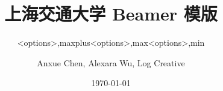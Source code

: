 \documentclass[
    aspectratio=169
]{ctexbeamer}
\begin{document}
    \title[SJTU Beamer Template] %
    {\textbf{上海交通大学 Beamer 模版}} %

    \author[Anxue Chen, Alexara Wu, Log Creative]
    {Anxue Chen, Alexara Wu, Log Creative}


    \date{\today}

    \subtitle{<options>,maxplus}
    \maketitle[maxplus]
    \makebottom[maxplus]

    \subtitle{<options>,max}
    \maketitle[max]
    \frame{}
    \makebottom[max]

    \subtitle{<options>,min}
    \maketitle[min]
    \makebottom[min]
\end{document}
